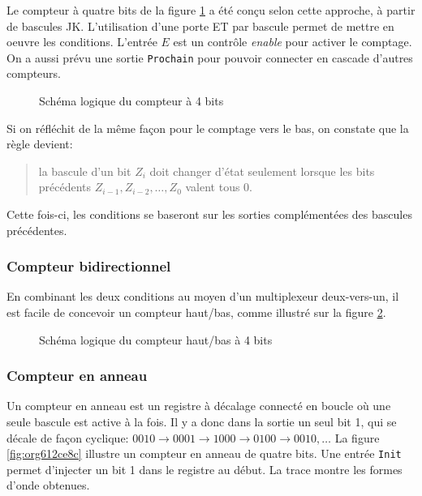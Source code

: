 \documentclass[11pt]{article}
\begin{document}
Le compteur à quatre bits de la figure \ref{fig:org2b23d6d} a été conçu
selon cette approche, à partir de bascules JK.  L'utilisation d'une
porte ET par bascule permet de mettre en oeuvre les
conditions. L'entrée \(E\) est un contrôle \emph{enable} pour activer le
comptage. On a aussi prévu une sortie \texttt{Prochain} pour pouvoir
connecter en cascade d'autres compteurs.

\begin{figure}[htbp]
\centering

\caption{\label{fig:org2b23d6d}Schéma logique du compteur à 4 bits}
\end{figure}

Si on réfléchit de la même façon pour le comptage vers le bas, on constate
que la règle devient:

\begin{quote}
la bascule d'un bit \(Z_i\) doit changer d'état
seulement lorsque les bits précédents \(Z_{i-1},Z_{i-2},\ldots, Z_0\)
valent tous 0.
\end{quote}
Cette fois-ci, les conditions se baseront sur les sorties
complémentées des bascules précédentes.

\subsubsection{Compteur bidirectionnel}
\label{sec:org11abe7a}

En combinant les deux conditions au moyen d'un multiplexeur
deux-vers-un, il est facile de concevoir un compteur haut/bas, comme
illustré sur la figure \ref{fig:orgbe3854c}.

\begin{figure}[htbp]
\centering

\caption{\label{fig:orgbe3854c}Schéma logique du compteur haut/bas à 4 bits}
\end{figure}

\subsubsection{Compteur en anneau}
\label{sec:org13a3d95}

Un compteur en anneau est un registre à décalage connecté en boucle où
une seule bascule est active à la fois. Il y a donc dans la sortie un
seul bit 1, qui se décale de façon cyclique: \(0010 \rightarrow 0001
\rightarrow 1000 \rightarrow 0100 \rightarrow 0010, \ldots\) La
figure \ref{fig:org612ce8c} illustre un compteur en anneau de quatre bits. Une
entrée \texttt{Init} permet d'injecter un bit 1 dans le registre au début. La
trace montre les formes d'onde obtenues.
\end{document}
